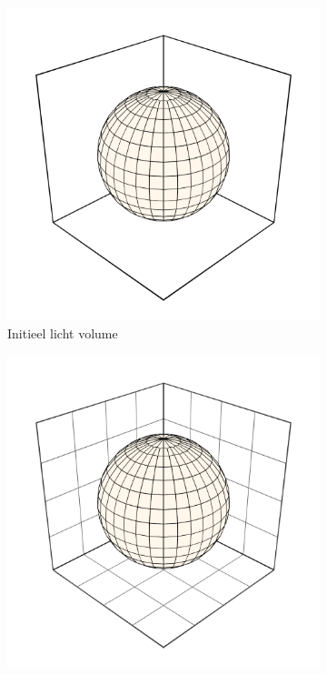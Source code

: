 \begin{figure}[t]
  \centering
  \begin{subfigure}[b]{.3\linewidth}
    \includegraphics[width=\textwidth]{./img/raw/hs-slt-algorithm/hs-slt-algorithm-1.png}%
    \caption{Initieel licht volume}%
    \label{fig:hs-p1a}%
  \end{subfigure}
  \begin{subfigure}[b]{.3\linewidth}
    \includegraphics[width=\textwidth]{./img/raw/hs-slt-algorithm/hs-slt-algorithm-2.png}%

\end{subfigure}
\end{figure}
